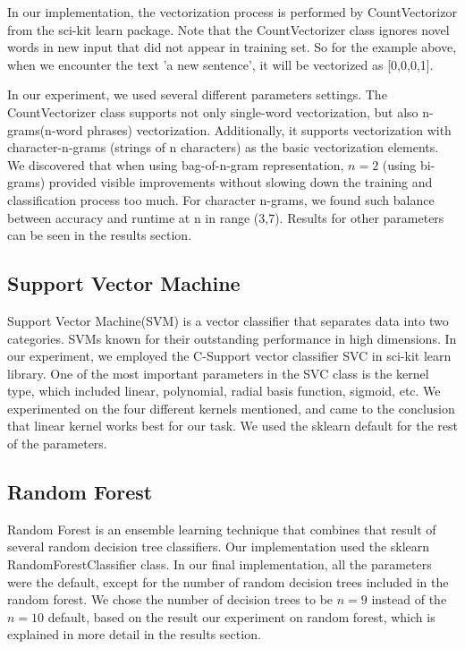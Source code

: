 \documentclass[11pt]{article}
\begin{document}
In our implementation, the vectorization process is performed by
CountVectorizor from the sci-kit learn package. Note that the CountVectorizer
class ignores novel words in new input that did not appear in training set. So
for the example above, when we encounter the text 'a new sentence', it will be
vectorized as [0,0,0,1].

In our experiment, we used several different parameters settings. The
CountVectorizer class supports not only single-word vectorization, but also
n-grams(n-word phrases) vectorization. Additionally, it supports vectorization
with character-n-grams (strings of n characters) as the basic vectorization
elements. We discovered that when using bag-of-n-gram representation, $n=2$
(using bi-grams) provided visible improvements without slowing down the
training and classification process too much. For character n-grams, we found
such balance between accuracy and runtime at n in range (3,7). Results for
other parameters can be seen in the results section.

\subsection{Support Vector Machine}

Support Vector Machine(SVM) is a vector classifier that separates data into two
categories. SVMs known for their outstanding performance in high dimensions. In
our experiment, we employed the C-Support vector classifier SVC in sci-kit
learn library. One of the most important parameters in the SVC class is the
kernel type, which included linear, polynomial, radial basis function, sigmoid,
etc. We experimented on the four different kernels mentioned, and came to the
conclusion that linear kernel works best for our task. We used the sklearn
default for the rest of the parameters.

\subsection{Random Forest}

Random Forest is an ensemble learning technique that combines that result of
several random decision tree classifiers. Our implementation used the sklearn
RandomForestClassifier class. In our final implementation, all the parameters
were the default, except for the number of random decision trees included in
the random forest. We chose the number of decision trees to be $n = 9$ instead
of the $n = 10$ default, based on the result our experiment on random forest,
which is explained in more detail in the results section.
\end{document}
